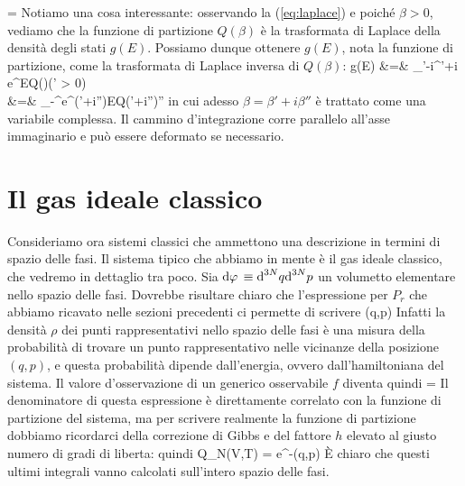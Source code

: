 \be
{} = 
\ee
Notiamo una cosa interessante: osservando la (\ref{eq:laplace}) e poiché $\beta > 0$, vediamo che la funzione di partizione $Q(\beta)$ è la trasformata di Laplace della densità degli stati $g(E)$. Possiamo dunque ottenere $g(E)$, nota la funzione di partizione, come la trasformata di Laplace inversa di $Q(\beta)$:
\bea 
\label{eq:gfromq}
g(E) &=& \int_{\beta'-i\infty}^{\beta'+i\infty} e^{\beta E}Q(\beta)\de\beta\quad(\beta' > 0)
\nonumber \\
&=& \int_{-\infty}^{\infty}e^{(\beta'+i\beta'')E}Q(\beta'+i\beta'')\de\beta''
\eea
in cui adesso $\beta = \beta' + i\beta''$ è trattato come una variabile complessa. Il cammino d'integrazione corre parallelo all'asse immaginario e può essere deformato se necessario.

\section{Il gas ideale classico}

Consideriamo ora sistemi classici che ammettono una descrizione in termini di spazio delle fasi. Il sistema tipico che abbiamo in mente è il gas ideale classico, che vedremo in dettaglio tra poco. Sia ${\textrm d}\varphi\, \equiv {\textrm d}^{3N}q{\textrm d}^{3N}p$ un volumetto elementare nello spazio delle fasi. Dovrebbe risultare chiaro che l'espressione per $P_r$ che abbiamo ricavato nelle sezioni precedenti ci permette di scrivere
\be
\rho(q,p) \propto {}
\ee
Infatti la densità $\rho$ dei punti rappresentativi nello spazio delle fasi è una misura della probabilità di trovare un punto rappresentativo nelle vicinanze della posizione $(q,p)$, e questa probabilità dipende dall'energia, ovvero dall'hamiltoniana del sistema. Il valore d'osservazione di un generico osservabile $f$ diventa quindi
\be
{} = 
\ee
Il denominatore di questa espressione è direttamente correlato con la funzione di partizione del sistema, ma per scrivere realmente la funzione di partizione dobbiamo ricordarci della correzione di Gibbs e del fattore $h$ elevato al giusto numero di gradi di liberta: quindi
\be
Q_N(V,T) = \int e^{-\beta\Ham(q,p)}\dephi
\ee
\`E chiaro che questi ultimi integrali vanno calcolati sull'intero spazio delle fasi.

